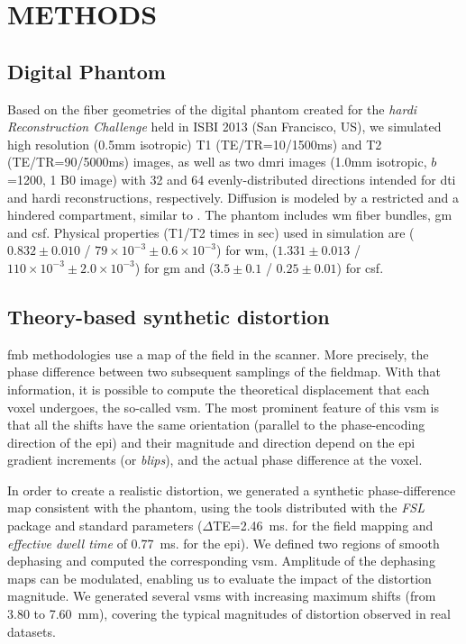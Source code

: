 \section{METHODS}

\subsection{Digital Phantom}
Based on the fiber geometries of the digital phantom 
created for the \emph{\Gls*{hardi} 
Reconstruction Challenge} held in ISBI 2013 
(San Francisco, US), we simulated high resolution 
(0.5mm isotropic) T1 (TE/TR=10/1500ms) and T2 
(TE/TR=90/5000ms) images, as well as two \gls*{dmri}
images (1.0mm isotropic, $b$=1200, 1 B0 image) with
32 and 64 evenly-distributed directions intended
for \gls*{dti} and \gls*{hardi} reconstructions, respectively.
Diffusion is modeled by a restricted and a hindered
compartment, similar to \cite{assaf_composite_2005}.
The phantom includes \gls*{wm} fiber bundles,
\gls*{gm} and \gls*{csf}. Physical properties
(T1/T2 times in sec) used in simulation are
($0.832\pm0.010$ / $79\times10^{-3}\pm0.6\times10^{-3}$)
for \gls*{wm},
($1.331\pm0.013$ / $110\times10^{-3}\pm2.0\times10^{-3}$) for
\gls*{gm} and ($3.5\pm0.1$ / $0.25\pm0.01$) for \gls*{csf}.

\subsection{Theory-based synthetic distortion}
\label{sec:distortion}
\Gls*{fmb} methodologies use a map
of the field in the scanner. More precisely, the
phase difference between two subsequent samplings
of the fieldmap. With that information, it is possible
to compute the theoretical displacement that each
voxel undergoes, the so-called \gls*{vsm}. The
most prominent feature of this \gls*{vsm} is that all
the shifts have the same orientation (parallel to the
phase-encoding direction of the \gls*{epi}) and their
magnitude and direction depend on the \gls*{epi} 
gradient increments (or \emph{blips}), and the actual
phase difference at the voxel.

In order to create a realistic distortion, we
generated a synthetic phase-difference map 
consistent with the phantom, using the 
tools distributed with the \emph{FSL} package 
\cite{jenkinson_fsl_2012}  and
standard parameters ($\Delta$TE=2.46~ms. for the
field mapping and \emph{effective dwell time} of 
0.77~ms. for the \gls*{epi}).
We defined two regions of smooth dephasing and 
computed the corresponding \gls*{vsm}. Amplitude
of the dephasing maps can be modulated, enabling
us to evaluate the impact of the distortion magnitude.
We generated several \glspl*{vsm} with increasing
maximum shifts (from 3.80 to 7.60~mm), covering 
the typical magnitudes of distortion observed 
in real datasets.

